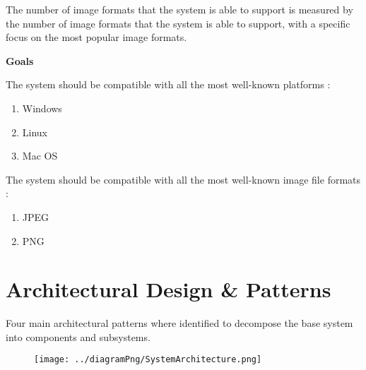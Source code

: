 \documentclass[11pt,a4paper]{article}
\begin{document}
The number of image formats that the system is able to support is measured by
the number of image formats that the system is able to support, with a specific
focus on the most popular image formats.

{\bf Goals}

The system should be compatible with all the most well-known platforms : 
\begin{enumerate}
    \item Windows
    \item Linux
    \item Mac OS
\end{enumerate}

The system should be compatible with all the most well-known image file formats : 
\begin{enumerate}
    \item JPEG
    \item PNG
\end{enumerate}


\pagebreak

\section{Architectural Design \& Patterns}
Four main architectural patterns where identified to decompose the base system
into components and subsystems.

\begin{figure}[ht]
	\centering
	\texttt{[image: ../diagramPng/SystemArchitecture.png]}
\end{figure}
\end{document}

